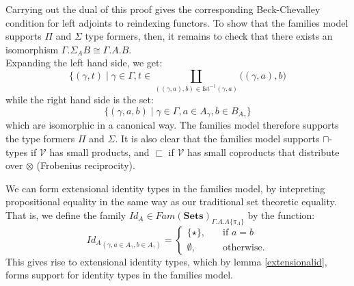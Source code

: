 Carrying out the dual of this proof gives the corresponding Beck-Chevalley condition for left adjoints to reindexing functors.
To show that the families model supports $\Pi$ and $\Sigma$ type formers, then, it remains to check that there exists an isomorphism $\Gamma.\Sigma_AB \cong \Gamma.A.B$.\\
Expanding the left hand side, we get:
\[
  \{(\gamma, t) \; | \; \gamma \in \Gamma, t \in \coprod_{((\gamma, a), b) \in \text{fst}^{-1}(\gamma, a)}\Big ((\gamma, a), b\Big)
\]
while the right hand side is the set:
\[
  \{(\gamma, a, b) \; | \; \gamma \in \Gamma, a \in A_\gamma, b \in B_{A_\gamma}\}
\]
which are isomorphic in a canonical way. The families model therefore supports the type formers $\Pi$ and $\Sigma$. It is also clear that the families model supports $\sqcap$-types if $\mathcal{V}$ has small products, and $\sqsubset$ if $\mathcal{V}$ has small coproducts that distribute over $\otimes$ (Frobenius reciprocity).

We can form extensional identity types in the families model, by intepreting propositional equality in the same way as our traditional set theoretic equality. That is, we define the family $Id_A \in Fam(\mathbf{Sets})_{\Gamma.A.A\{\pi_A\}}$ by the function:
\[
  {Id_A}_{(\gamma, a \in A_\gamma, b \in A_\gamma)} = \begin{cases} \{ \star \}, &\quad \text{if } a = b\\
  \emptyset, &\quad \text{otherwise.}
    \end{cases}
\]
This gives rise to extensional identity types, which by lemma \ref{extensionalid}, forms support for identity types in the families model.


